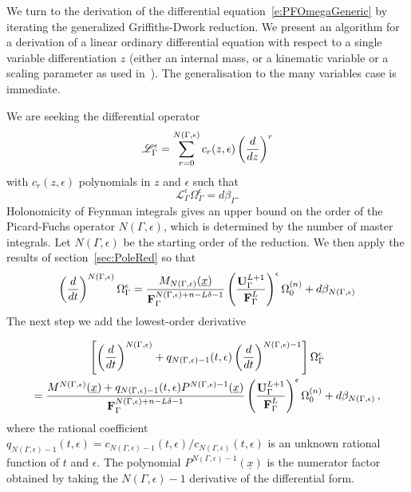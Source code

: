 \documentclass[a4paper,12pt]{article}
\numberwithin{equation}{section}
\numberwithin{figure}{section}
\begin{document}
We turn to the derivation of the differential
equation~\eqref{e:PFOmegaGeneric}  by iterating the generalized
Griffiths-Dwork reduction. We present an algorithm for a derivation of
a linear ordinary differential equation with respect to a single
variable differentiation $z$ (either an internal mass, or a kinematic
variable or a scaling parameter as used
in~\cite{Lairez:2022zkj,Doran:2023yzu}). The generalisation to the
many variables case is immediate.

We are seeking the differential operator 
\begin{equation}\label{e:PFgeneric}
  \mathscr{L}_\Gamma^\epsilon=\sum_{r=0}^{N(\Gamma,\epsilon)}
  c_r(z,\epsilon) \left(d\over dz\right)^r
\end{equation}
with $c_r(z,\epsilon)$ polynomials in $z$ and $\epsilon$ such that
\begin{equation}
     \mathscr{L}_\Gamma^\epsilon \Omega_\Gamma^\epsilon= d\beta_\Gamma.
   \end{equation}
%
Holonomicity of Feynman integrals gives an upper bound on the order of the Picard-Fuchs operator $N(\Gamma,\epsilon)$, which is  determined by
 the number of master
integrals. Let $N(\Gamma,\epsilon)$  be the starting order of the reduction.  We then apply the results of
section~\ref{sec:PoleRed} so that
%
\begin{equation}\label{e:step1}
\left(d\over dt\right)^{N(\Gamma,\epsilon)} \Omega_\Gamma^\epsilon= {M_{
      N(\Gamma,\epsilon)}(\underline x)\over
    \textbf{F}_\Gamma^{N(\Gamma,\epsilon)+n-L\delta-1}
  }\left(\textbf{U}_\Gamma^{L+1}\over \textbf{F}_\Gamma^L
  \right)^\epsilon \Omega_0^{(n)}+ d\beta_{N(\Gamma,\epsilon)}  
\end{equation}
%
The next step we add the lowest-order derivative

\begin{multline}\label{e:step2}
\left[\left(d\over dt\right)^{N(\Gamma,\epsilon)}
  +q_{N(\Gamma,\epsilon)-1}(t,\epsilon) \left(d\over dt\right)^{N(\Gamma,\epsilon)-1}\right] \Omega_\Gamma^\epsilon\cr= {M^{
      N(\Gamma,\epsilon)}(\underline x)+q_{N(\Gamma,\epsilon)-1}(t,\epsilon)
    P^{N(\Gamma,\epsilon)-1}(\underline x) \over
    \textbf{F}_\Gamma^{N(\Gamma,\epsilon)+n-L\delta-1}
  }\left(\textbf{U}_\Gamma^{L+1}\over \textbf{F}_\Gamma^L
  \right)^\epsilon \Omega_0^{(n)}+ d\beta_{N(\Gamma,\epsilon)}\, ,  
\end{multline}
where the rational coefficient
$q_{N(\Gamma,\epsilon)-1}(t,\epsilon)=c_{N(\Gamma,\epsilon)-1}(t,\epsilon)/c_{N(\Gamma,\epsilon)}(t,\epsilon)$
is an unknown rational function of $t$ and $\epsilon$. 
The polynomial $ P^{N(\Gamma,\epsilon)-1}(\underline x) $
is the numerator factor obtained by taking the $N(\Gamma,\epsilon)-1$
derivative of the differential form.
\end{document}

